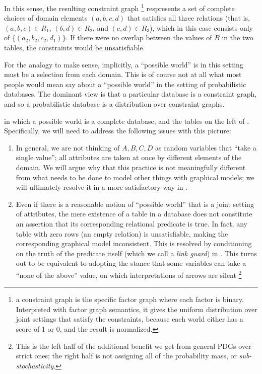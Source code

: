 \documentclass{article}
\theoremstyle{definition}
\theoremstyle{remark}
\begin{document}
 
In this sense, the resulting constraint graph%
\footnote{a constraint graph is the specific factor graph where each factor is binary.
	Interpreted with factor graph semantics, it gives the uniform distribution over joint settings that satisfy the constraints, because each world either has a score of 1 or 0, and the result is normalized.}
respresents a set of complete choices of domain elements $(a,b,c,d)$ that satisfies all three relations (that is, $(a,b,c) \in R_1$, $(b,d) \in R_2$, and $(c,d) \in R_3$), which in this case consists only of $\{(a_2,b_2, c_2,d_1)\}$. If there were no overlap between the values of $B$ in the two tables, the constraints would be unsatisfiable. 


For the analogy to make sense, implicitly, a ``possible world'' is in this setting must be a selection from each domain.
This is of course not at all what most people would mean say about a ``possible world'' in the setting of probabilistic databases. 
The dominant view is that a particular database is a constraint graph, and so a probabilistic database is a distribution over constraint graphs. 

 in which a possible world is a complete database, and the tables on the left of . Specifically, we will need to address the following issues with this picture:

\begin{enumerate}
	\item  In general, we are not thinking of  $A, B, C, D$ as random variables that ``take a single value''; all attributes are taken at once by different elements of the domain. We will argue why that this practice is not meaningfully different from what needs to be done to model other things with graphical models; we will ultimately resolve it in a more satisfactory way in .
	\item Even if there is a reasonable notion of ``possible world'' that is a joint setting of attributes, the mere existence of a table in a database does not constitute an assertion that its corresponding relational predicate is true. In fact, any table with zero rows (an empty relation) is unsatisfiable, making the corresponding graphical model inconsistent. This is resolved by conditioning on the truth of the predicate itself (which we call a \emph{link guard}) in . This turns out to be equivalent to adopting the stance that some variables can take a ``none of the above'' value, on which interpretations of arrows are silent%
	\footnote{This is the left half of the additional benefit we get from general PDGs over strict ones; the right half is not assigning all of the probability mass, or \emph{sub-stochasticity}. }
\end{enumerate}
\end{document}
